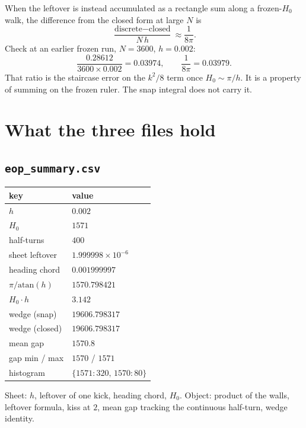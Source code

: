 \documentclass[10pt,a4paper]{article}
\theoremstyle{plain}
\theoremstyle{definition}
\theoremstyle{remark}
\begin{document}
When the leftover is instead accumulated as a rectangle sum along a frozen-\(H_0\) walk, the difference from the closed form at large \(N\) is
\[
\frac{\text{discrete}-\text{closed}}{N\,h}\approx\frac{1}{8\pi}.
\]
Check at an earlier frozen run, \(N=3600\), \(h=0.002\):
\[
\frac{0.28612}{3600\times 0.002}=0.03974,\qquad
\frac{1}{8\pi}=0.03979.
\]
That ratio is the staircase error on the \(k^2/8\) term once \(H_0\sim \pi/h\).
It is a property of summing on the frozen ruler.
The snap integral does not carry it.

\section{What the three files hold}

\subsection{\texttt{eop\_summary.csv}}

\begin{center}
\begin{tabular}{@{}ll@{}}
\toprule
key & value \\
\midrule
\(h\) & \(0.002\) \\
\(H_0\) & \(1571\) \\
half-turns & \(400\) \\
sheet leftover & \(1.999998\times 10^{-6}\) \\
heading chord & \(0.001999997\) \\
\(\pi/\mathrm{atan}(h)\) & \(1570.798421\) \\
\(H_0\cdot h\) & \(3.142\) \\
wedge (snap) & \(19606.798317\) \\
wedge (closed) & \(19606.798317\) \\
mean gap & \(1570.8\) \\
gap min / max & \(1570\) / \(1571\) \\
histogram & \(\{1571:320,\,1570:80\}\) \\
\bottomrule
\end{tabular}
\end{center}

Sheet: \(h\), leftover of one kick, heading chord, \(H_0\).
Object: product of the walls, leftover formula, kiss at \(2\), mean gap tracking the continuous half-turn, wedge identity.
\end{document}
